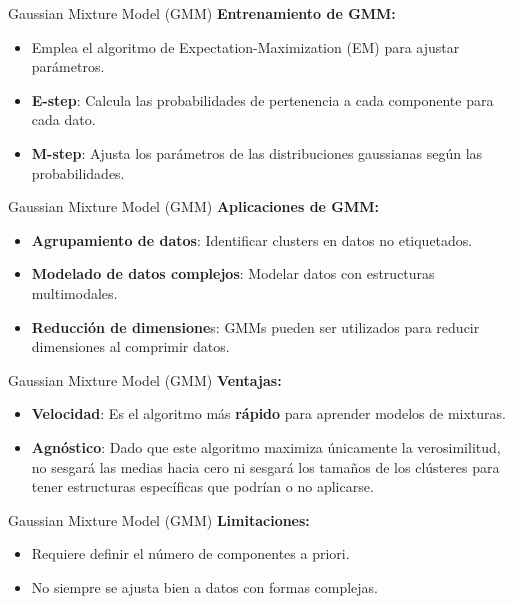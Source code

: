 \begin{frame}{Gaussian Mixture Model (GMM)}
\textbf{Entrenamiento de GMM:}
\begin{itemize}
    \item Emplea el algoritmo de Expectation-Maximization (EM) para ajustar parámetros.
    \item \textbf{E-step}: Calcula las probabilidades de pertenencia a cada componente para cada dato.
    \item \textbf{M-step}: Ajusta los parámetros de las distribuciones gaussianas según las probabilidades.
\end{itemize}
\end{frame}


\begin{frame}{Gaussian Mixture Model (GMM)}
\textbf{Aplicaciones de GMM:}
\begin{itemize}
    \item \textbf{Agrupamiento de datos}: Identificar clusters en datos no etiquetados.
    \item \textbf{Modelado de datos complejos}: Modelar datos con estructuras multimodales.
    \item \textbf{Reducción de dimensione}s: GMMs pueden ser utilizados para reducir dimensiones al comprimir datos.
\end{itemize}
\end{frame}


\begin{frame}{Gaussian Mixture Model (GMM)}
\textbf{Ventajas:}
\begin{itemize}
    \item \textbf{Velocidad}: Es el algoritmo más \textbf{rápido} para aprender modelos de mixturas.
    \item \textbf{Agnóstico}: Dado que este algoritmo maximiza únicamente la verosimilitud, no sesgará las medias hacia cero ni sesgará los tamaños de los clústeres para tener estructuras específicas que podrían o no aplicarse.

\end{itemize}
\end{frame}

\begin{frame}{Gaussian Mixture Model (GMM)}
\textbf{Limitaciones:}
\begin{itemize}
    \item Requiere definir el número de componentes a priori.
    \item No siempre se ajusta bien a datos con formas complejas.
\end{itemize}
\end{frame}



